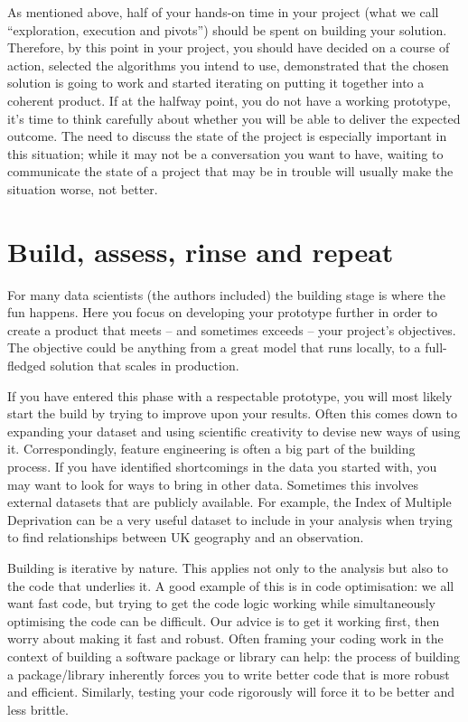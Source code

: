 \documentclass[
]{book}
\begin{document}
As mentioned above, half of your hands-on time in your project (what we call ``exploration, execution and pivots'') should be spent on building your solution. Therefore, by this point in your project, you should have decided on a course of action, selected the algorithms you intend to use, demonstrated that the chosen solution is going to work and started iterating on putting it together into a coherent product. If at the halfway point, you do not have a working prototype, it's time to think carefully about whether you will be able to deliver the expected outcome. The need to discuss the state of the project is especially important in this situation; while it may not be a conversation you want to have, waiting to communicate the state of a project that may be in trouble will usually make the situation worse, not better.

\hypertarget{build-assess-rinse-and-repeat}{%
\section{Build, assess, rinse and repeat}\label{build-assess-rinse-and-repeat}}

For many data scientists (the authors included) the building stage is where the fun happens. Here you focus on developing your prototype further in order to create a product that meets -- and sometimes exceeds -- your project's objectives. The objective could be anything from a great model that runs locally, to a full-fledged solution that scales in production.

If you have entered this phase with a respectable prototype, you will most likely start the build by trying to improve upon your results. Often this comes down to expanding your dataset and using scientific creativity to devise new ways of using it. Correspondingly, feature engineering is often a big part of the building process. If you have identified shortcomings in the data you started with, you may want to look for ways to bring in other data. Sometimes this involves external datasets that are publicly available. For example, the Index of Multiple Deprivation can be a very useful dataset to include in your analysis when trying to find relationships between UK geography and an observation.

Building is iterative by nature. This applies not only to the analysis but also to the code that underlies it. A good example of this is in code optimisation: we all want fast code, but trying to get the code logic working while simultaneously optimising the code can be difficult. Our advice is to get it working first, then worry about making it fast and robust. Often framing your coding work in the context of building a software package or library can help: the process of building a package/library inherently forces you to write better code that is more robust and efficient. Similarly, testing your code rigorously will force it to be better and less brittle.
\end{document}

